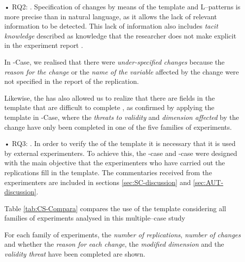 \begin{itemize}
\begin{enumerate}
    \end{enumerate}

    \item[•] RQ2: \emph{\Precision}. Specification of changes by means of the template and L--patterns is more precise than in natural language, as it allows the lack of relevant information to be detected.
    This lack of information also includes \emph{tacit knowledge} described as knowledge that the researcher does not make explicit in the experiment report \cite{shull2002replicating}.
    
    In \SoftEng-Case, we realised that there were \emph{under-specified changes} because the \emph{reason for the change} or the \emph{name of the variable} affected by the change were not specified in the report of the replication.

    Likewise, the \precision has also allowed us to realize that there are fields in the template that are difficult to complete , as confirmed by applying the template in \Science-Case, where the \emph{threats to validity} and \emph{dimension affected} by the change have only been completed in one of the five families of experiments. \\ %
    
    \item[•] RQ3: \emph{\Understandability}. 
    In order to verify the \understandability of the template it is necessary that it is used by external experimenters.
    To achieve this, the \Science-case and \Automatic-case were designed with the main objective that the experimenters who have carried out the replications fill in the template. The commentaries received from the experimenters are included in sections \ref{sec:SC-discussion} and \ref{sec:AUT-discussion}.
    
    Table \ref{tab:CS-Compara} compares the use of the template considering all families of experiments analysed in this multiple--case study
    

    
    For each family of experiments, the \emph{number of replications}, \emph{number of changes} and whether the \emph{reason for each change}, the \emph{modified dimension} and the \emph{validity threat} have been completed are shown.
    

\end{itemize}
